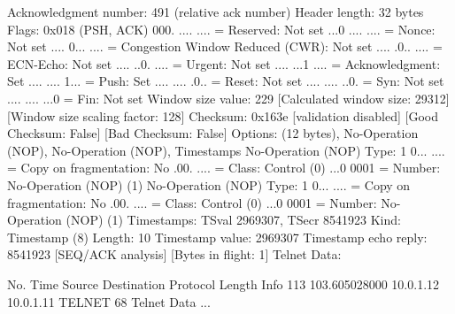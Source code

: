     Acknowledgment number: 491    (relative ack number)
    Header length: 32 bytes
    Flags: 0x018 (PSH, ACK)
        000. .... .... = Reserved: Not set
        ...0 .... .... = Nonce: Not set
        .... 0... .... = Congestion Window Reduced (CWR): Not set
        .... .0.. .... = ECN-Echo: Not set
        .... ..0. .... = Urgent: Not set
        .... ...1 .... = Acknowledgment: Set
        .... .... 1... = Push: Set
        .... .... .0.. = Reset: Not set
        .... .... ..0. = Syn: Not set
        .... .... ...0 = Fin: Not set
    Window size value: 229
    [Calculated window size: 29312]
    [Window size scaling factor: 128]
    Checksum: 0x163e [validation disabled]
        [Good Checksum: False]
        [Bad Checksum: False]
    Options: (12 bytes), No-Operation (NOP), No-Operation (NOP), Timestamps
        No-Operation (NOP)
            Type: 1
                0... .... = Copy on fragmentation: No
                .00. .... = Class: Control (0)
                ...0 0001 = Number: No-Operation (NOP) (1)
        No-Operation (NOP)
            Type: 1
                0... .... = Copy on fragmentation: No
                .00. .... = Class: Control (0)
                ...0 0001 = Number: No-Operation (NOP) (1)
        Timestamps: TSval 2969307, TSecr 8541923
            Kind: Timestamp (8)
            Length: 10
            Timestamp value: 2969307
            Timestamp echo reply: 8541923
    [SEQ/ACK analysis]
        [Bytes in flight: 1]
Telnet
    Data: 

No.     Time           Source                Destination           Protocol Length Info
    113 103.605028000  10.0.1.12             10.0.1.11             TELNET   68     Telnet Data ...

